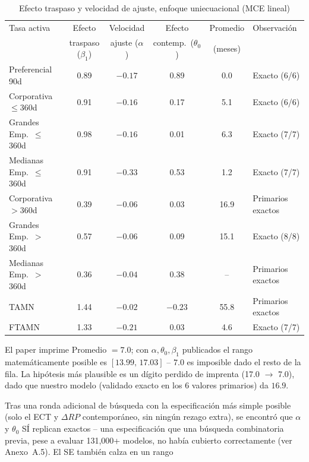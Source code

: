 \documentclass[12pt, letterpaper]{article}
\begin{document}
\begin{table}[ht]
\renewcommand{\thetable}{4}
\begin{threeparttable}
\caption{Efecto traspaso y velocidad de ajuste, enfoque uniecuacional
         (MCE lineal)}
\label{tab:cuadro4}
\small
\begin{tabular}{lccccl}
\toprule
Tasa activa & Efecto & Velocidad & Efecto & Promedio & Observación\\
 & traspaso ($\beta_1$) & ajuste ($\alpha$) & contemp.\ ($\theta_0$) & (meses) & \\
\midrule
Preferencial 90d         & 0.89 & $-0.17$ & 0.89  & 0.0  & Exacto (6/6) \\
Corporativa $\le$360d    & 0.91 & $-0.16$ & 0.17  & 5.1  & Exacto (6/6) \\
Grandes Emp.\ $\le$360d  & 0.98 & $-0.16$ & 0.01  & 6.3  & Exacto (7/7) \\
Medianas Emp.\ $\le$360d & 0.91 & $-0.33$ & 0.53  & 1.2  & Exacto (7/7) \\
Corporativa $>$360d      & 0.39 & $-0.06$ & 0.03  & 16.9\tnote{a} & Primarios exactos \\
Grandes Emp.\ $>$360d    & 0.57 & $-0.06$ & 0.09  & 15.1 & Exacto (8/8) \\
Medianas Emp.\ $>$360d   & 0.36 & $-0.04$ & 0.38  & --\tnote{b}   & Primarios exactos \\
TAMN                     & 1.44 & $-0.02$ & $-0.23$& 55.8\tnote{c} & Primarios exactos \\
FTAMN                    & 1.33 & $-0.21$ & 0.03  & 4.6  & Exacto (7/7) \\
\bottomrule
\end{tabular}
\begin{tablenotes}[flushleft]
\footnotesize
\item[a] El paper imprime Promedio $=7.0$; con $\alpha,\theta_0,\beta_1$
publicados el rango matemáticamente posible es $[13.99,\,17.03]$ --
$7.0$ es imposible dado el resto de la fila. La hipótesis más plausible
es un dígito perdido de imprenta (17.0 $\to$ 7.0), dado que nuestro
modelo (validado exacto en los 6 valores primarios) da $16.9$.
\item[b] Tras una ronda adicional de búsqueda con la especificación
más simple posible (solo el ECT y $\Delta RP$ contemporáneo, sin
ningún rezago extra), se encontró que $\alpha$ y $\theta_0$ SÍ
replican exactos -- una especificación que una búsqueda combinatoria
previa, pese a evaluar 131,000+ modelos, no había cubierto
correctamente (ver Anexo~A.5). El SE también calza en un rango

\end{tablenotes}
\end{threeparttable}
\end{table}
\end{document}
